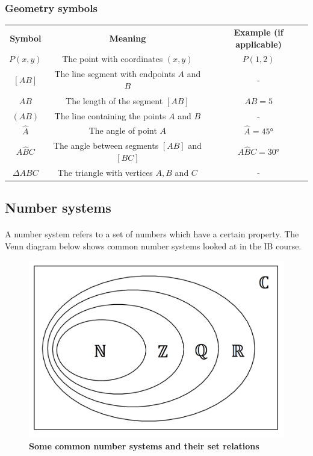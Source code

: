 \documentclass[12pt, a4paper, titlepage, twoside]{article}
\begin{document}
	\newpage	
	
	{\centering \subsubsection*{Geometry symbols}}
	
	{\centering
		\begin{longtable}{|c|c|c|} 
 			\hline
			\textbf{Symbol} & \textbf{Meaning} & \textbf{Example (if applicable)}\\
			\hhline{|=|=|=|}
			$P(x,y)$ & The point with coordinates $(x,y)$ & $P(1,2)$\\
			\hline
			$[AB]$ & The line segment with endpoints $A$ and $B$ & -\\
			\hline
			$AB$ & The length of the segment $[AB]$ & $AB = 5$\\
			\hline
			$(AB)$ & The line containing the points $A$ and $B$ & -\\
			\hline
			$\hat{A}$ & The angle of point $A$ & $\hat{A} = \ang{45}$\\
			\hline
			$A\hat{B}C$ & The angle between segments $[AB]$ and $[BC]$ & $A\hat{B}C = \ang{30}$\\
			\hline
			$\Delta ABC$ & The triangle with vertices $A,B$ and $C$ & -\\
			\hline
		\end{longtable}}
	
	\hfill
	
	\subsection{Number systems}
	
	\paragraph{}
	A number system refers to a set of numbers which have a certain property. The Venn diagram below shows common number systems 
	looked at in the IB course.
	
	\begin{figure}[H]
		\centering
		\includegraphics[width=12cm]{algebra-venn.png}
		\caption*{\textbf{Some common number systems and their set relations}}
	\end{figure}
	
\end{document}

